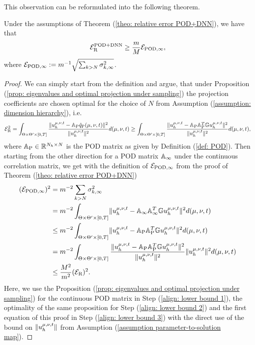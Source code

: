 This observation can be reformulated into the following theorem.

\begin{theorem} \label{theo: lower bound pod+dnn}
    Under the assumptions of Theorem (\ref{theo: relative error POD+DNN}), we have that 
    \begin{equation*}
        \mathcal{E}_\text{R}^\text{POD+DNN} \geq \frac{m}{M} \mathcal{E}_{\text{POD}, \infty},
    \end{equation*}
    where $\mathcal{E}_{\text{POD}, \infty} := m^{-1} \sqrt{\sum_{k > N} \sigma_{k, \infty}^2}$.
\end{theorem}
\begin{proof}
    We can simply start from the definition and argue, that under Proposition (\ref{prop: eigenvalues and optimal projection under sampling})
    the projection coefficients are chosen optimal for the choice of $N$ from Assumption (\ref{assumption: dimension hierarchy}), 
    i.e.
    \begin{equation*}
        \mathcal{E}_\text{R}^2 = \int_{\Theta \times \Theta' \times [0, T]} 
        \frac{\lVert u_h^{\mu, \nu, t} - \mathbb{A}_\text{P} \hat{q}_\text{P}(\mu, \nu, t) \rVert^2}{\lVert u_h^{\mu, \nu, t} \rVert^2} d(\mu, \nu, t)
        \geq
        \int_{\Theta \times \Theta' \times [0, T]} 
        \frac{\lVert u_h^{\mu, \nu, t} - \mathbb{A}_\text{P} \mathbb{A}_\text{P}^T \mathbb{G} u_h^{\mu, \nu, t} \rVert^2}{\lVert u_h^{\mu, \nu, t} \rVert^2} d(\mu, \nu, t),
    \end{equation*}
    where $\mathbb{A}_\text{P} \in \mathbb{R}^{N_h \times N}$ is the POD matrix as given by Definition (\ref{def: POD}). Then
    starting from the other direction for a POD matrix $\mathbb{A}_\infty$ under the continuous correlation matrix, we
    get with the definition of $\mathcal{E}_{\text{POD}, \infty}$ from the proof of Theorem (\ref{theo: relative error POD+DNN})
    \begin{align}
        (\mathcal{E}_{\text{POD}, \infty})^2 &= m^{-2} \sum_{k > N} \sigma_{k,\infty}^2 \\
        &= m^{-2} \int_{\Theta \times \Theta' \times [0, T]} \lVert u_h^{\mu, \nu, t} - \mathbb{A}_\infty \mathbb{A}_\infty^T \mathbb{G} u_h^{\mu, \nu, t} \rVert^2 d(\mu, \nu, t)
        \label{align: lower bound 1} \\
        &\leq m^{-2} \int_{\Theta \times \Theta' \times [0, T]} \lVert u_h^{\mu, \nu, t} - \mathbb{A}_\text{P} \mathbb{A}_\text{P}^T \mathbb{G} u_h^{\mu, \nu, t} \rVert^2 d(\mu, \nu, t)
        \label{align: lower bound 2} \\
        &= m^{-2} \int_{\Theta \times \Theta' \times [0, T]} \frac{\lVert u_h^{\mu, \nu, t} - \mathbb{A}_\text{P} \mathbb{A}_\text{P}^T \mathbb{G} u_h^{\mu, \nu, t} \rVert^2}{\lVert u_h^{\mu, \nu, t} \rVert^2}
        \lVert u_h^{\mu, \nu, t} \rVert^2 d(\mu, \nu, t) \\
        &\leq \frac{M^2}{m^2} (\mathcal{E}_\text{R})^2. \label{align: lower bound 3}
    \end{align}
    Here, we use the Proposition (\ref{prop: eigenvalues and optimal projection under sampling}) for the
    continuous POD matrix in Step (\ref{align: lower bound 1}), the optimality of the same proposition 
    for Step (\ref{align: lower bound 2}) and the first equation of this proof in 
    Step (\ref{align: lower bound 3}) with the direct use of the bound on $\lVert u_h^{\mu, \nu, t} \rVert$ from Assumption
    (\ref{assumption parameter-to-solution map}).
\end{proof}





